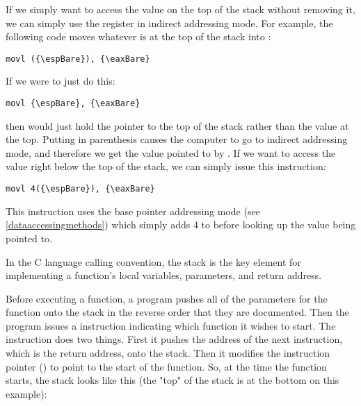 If we simply want to access the value on the top of the stack without removing it,
we can simply use the {\espRegIdx} register in indirect addressing mode.  For example, the 
following code moves whatever is at the top of the stack into
{\eaxReg}:

\begin{simpletyping}
\begin{lstlisting}
movl ({\espBare}), {\eaxBare}
\end{lstlisting}
\end{simpletyping}

If we were to just do this:

\begin{simpletyping}
\begin{lstlisting}
movl {\espBare}, {\eaxBare}
\end{lstlisting}
\end{simpletyping}

then {\eaxReg} would just hold the pointer to the top of the stack rather than
the value at the top.  Putting {\espReg} in parenthesis causes the computer to
go to indirect addressing mode,
and therefore we get the value pointed to by {\espRegIdx}.  If we want to 
access the value right below the top of the stack, we can simply issue this instruction:

\begin{simpletyping}
\begin{lstlisting}
movl 4({\espBare}), {\eaxBare}
\end{lstlisting}
\end{simpletyping}

This instruction uses the base pointer addressing mode
(see \autoref{dataaccessingmethods})
which simply adds 4 to {\espRegIdx} before looking up the value being pointed to.  

In the C language calling convention, the stack is the key 
element for implementing a function's local variables, 
parameters, and return address. 

Before executing a function,
a program pushes all of the parameters for the function onto
the stack in the reverse order that they are documented.  Then
the program issues a  instruction
indicating which function it wishes to start.  The 
 instruction does two things.  First
it pushes the address of the next instruction, which is the
return address, onto the stack.  Then it modifies the 
instruction pointer ({\eipRegIdx})
to point to the start of the function.  So, at the time the
function starts, the stack looks like this (the "top" of the stack is
at the bottom on this example):

